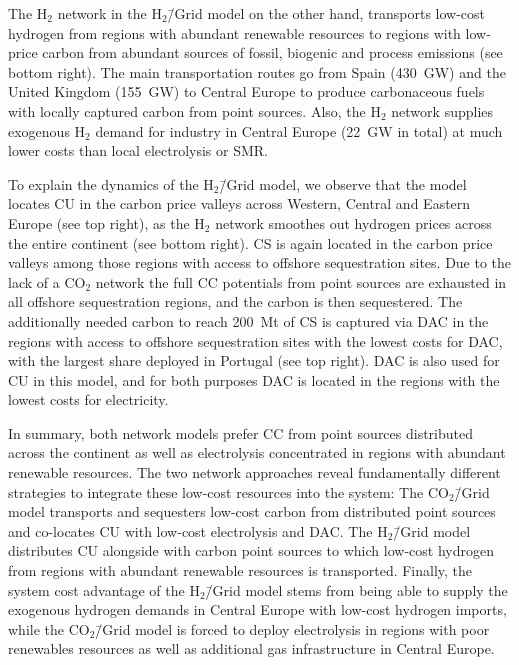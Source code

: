 \documentclass[twocolumn]{article}
\newcommand{\COtwo}{CO$_2$}
\newcommand{\Htwo}{H$_2$}
\newcommand{\modCO}{CO$_2$\=/Grid model}
\newcommand{\modH}{H$_2$\=/Grid model}
\newcommand{\carbonmodel}{CO$_2$\=/Grid model}
\newcommand{\hydrogenmodel}{H$_2$\=/Grid model}
\begin{document}
The \Htwo{} network in the \modH{} on the other hand, transports low-cost hydrogen from regions with abundant renewable resources to regions with low-price carbon from abundant sources of fossil, biogenic and process emissions (see bottom right). The main transportation routes go from Spain (430~GW) and the United Kingdom (155~GW) to Central Europe to produce carbonaceous fuels with locally captured carbon from point sources. Also, the \Htwo{} network supplies exogenous \Htwo{} demand for industry in Central Europe (22~GW in total) at much lower costs than local electrolysis or SMR.

To explain the dynamics of the \modH{}, we observe that the model locates CU in the carbon price valleys across Western, Central and Eastern Europe (see top right), as the \Htwo{} network smoothes out hydrogen prices across the entire continent (see bottom right). CS is again located in the carbon price valleys among those regions with access to offshore sequestration sites. Due to the lack of a \COtwo{} network the full CC potentials from point sources are exhausted in all offshore sequestration regions, and the carbon is then sequestered. The additionally needed carbon to reach 200~Mt of CS is captured via DAC in the regions with access to offshore sequestration sites with the lowest costs for DAC, with the largest share deployed in Portugal (see top right). DAC is also used for CU in this model, and for both purposes DAC is located in the regions with the lowest costs for electricity.

In summary, both network models prefer CC from point sources distributed across the continent as well as electrolysis concentrated in regions with abundant renewable resources. The two network approaches reveal fundamentally different strategies to integrate these low-cost resources into the system: The \carbonmodel{} transports and sequesters low-cost carbon from distributed point sources and co-locates CU with low-cost electrolysis and DAC. The \hydrogenmodel{} distributes CU alongside with carbon point sources to which low-cost hydrogen from regions with abundant renewable resources is transported.
%
Finally, the system cost advantage of the \modH{} stems from being able to supply the exogenous hydrogen demands in Central Europe with low-cost hydrogen imports, while the \modCO{} is forced to deploy electrolysis in regions with poor renewables resources as well as additional gas infrastructure in Central Europe.
\end{document}
